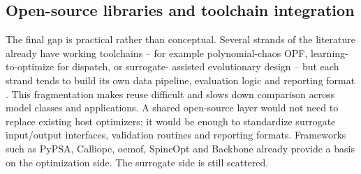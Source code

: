 \documentclass[final,5p,times,twocolumn]{elsarticle}
\begin{document}
\subsection{Open-source libraries and toolchain integration}
\label{sec:ch:tooling}
The final gap is practical rather than conceptual. Several strands of
the literature already have working toolchains -- for example
polynomial-chaos OPF, learning-to-optimize for dispatch, or surrogate-
assisted evolutionary design -- but each strand tends to build its own
data pipeline, evaluation logic and reporting format
\cite{Muhlpfordt20194806,Mitrovic2023__2,Mitrovic2023__3,Wu2022231,Chen20244723,Chen2022,Hirvonen2017323,Schulte2020}.
This fragmentation makes reuse difficult and slows down comparison
across model classes and applications. A shared open-source layer would
not need to replace existing host optimizers; it would be enough to
standardize surrogate input/output interfaces, validation routines and
reporting formats. Frameworks such as PyPSA, Calliope, oemof, SpineOpt
and Backbone already provide a basis on the optimization side. The
surrogate side is still scattered.
\end{document}
